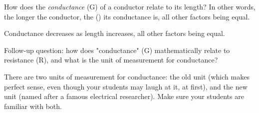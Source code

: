 

How does the {\it conductance} (G) of a conductor relate to its length?  In other words, the longer the conductor, the () its conductance is, all other factors being equal.







Conductance decreases as length increases, all other factors being equal.

\vskip 10pt

Follow-up question: how does "conductance" (G) mathematically relate to resistance (R), and what is the unit of measurement for conductance?







There are two units of measurement for conductance: the old unit (which makes perfect sense, even though your students may laugh at it, at first), and the new unit (named after a famous electrical researcher).  Make sure your students are familiar with both.




